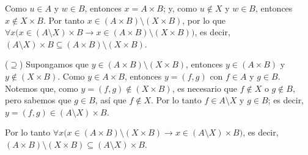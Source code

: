 \documentclass[letterpaper,DIV=14,headsepline,12pt]{scrartcl}
\makeatletter
\renewenvironment{proof}[1][]{%
        \par\pushQED{\qed}%
        \normalfont\topsep6pt \partopsep0pt %
        \trivlist
        \item[\hskip\labelsep
                \textbf{\textit{Demostración.}}%
        ]#1
        }{%
        \popQED\endtrivlist\@endpefalse
    }
\makeatother
\begin{document}
\begin{proof}
        Como $u \in A$ y $w \in B$, entonces $x=A \times B$; y, como $u \notin X$ y $w \in B$, entonces $x \notin X \times B$. Por tanto $x \in (A \times B) \setminus (X \times B)$, por lo que $\forall x \big( x \in (A \setminus X) \times B \to x \in (A \times B) \setminus (X \times B) \big)$, es decir, $(A \setminus X) \times B \subseteq (A \times B) \setminus (X \times B)$.

        ($\supseteq$) Supongamos que $y \in (A \times B) \setminus (X \times B)$, entonces $y \in (A \times B)$ y $y \notin (X \times B)$. Como $y \in A \times B$, entonces $y=(f,g)$ con $f \in A$ y $g \in B$. Notemos que, como $y=(f,g) \notin (X \times B)$, es necesario que $f \notin X$ o $g \notin B$, pero sabemos que $g \in B$, así que $f \notin X$. Por lo tanto $f \in A \setminus X$ y $g \in B$; es decir, $y = (f,g) \in (A \setminus X) \times B$.
        
        Por lo tanto $\forall x \big( x \in(A \times B) \setminus (X \times B) \to x \in (A \setminus X) \times B \big)$, es decir, $(A \times B) \setminus (X \times B) \subseteq (A \setminus X) \times B$.
    \end{proof}
\end{document}
